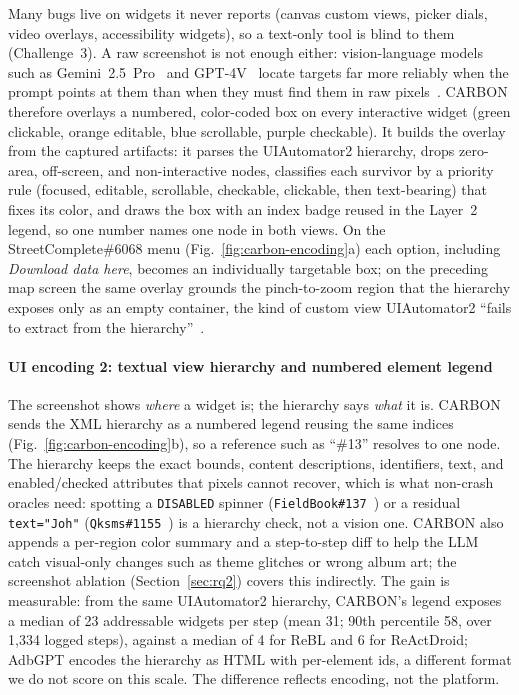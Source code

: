 \documentclass[10pt,conference,a4paper]{IEEEtran}
\begin{document}
  \iffalse
  Many bugs live on widgets it
  never reports (canvas custom views, picker dials, video overlays,
  accessibility widgets), so a text-only tool is blind to them
  (Challenge~3). A raw screenshot is not enough either: vision-language
  models such as Gemini~2.5~Pro~\cite{gemini25pro} and GPT-4V~\cite{gpt4v}
  locate targets far more reliably when the prompt points at them than
  when they must find them in raw pixels~\cite{cogagent,seeact}. CARBON
  therefore overlays a numbered, color-coded box on every interactive
  widget (green clickable, orange editable, blue scrollable, purple
  checkable). It builds the overlay from the captured artifacts: it
  parses the UIAutomator2 hierarchy, drops zero-area, off-screen, and
  non-interactive nodes, classifies each survivor by a priority rule
  (focused, editable, scrollable, checkable, clickable, then
  text-bearing) that fixes its color, and draws the box with an index
  badge reused in the Layer~2 legend, so one number names one node in
  both views. On the StreetComplete\#6068 menu
  (Fig.~\ref{fig:carbon-encoding}a) each option, including
  \emph{Download data here}, becomes an individually targetable box; on
  the preceding map screen the same overlay grounds the pinch-to-zoom
  region that the hierarchy exposes only as an empty container, the kind
  of custom view UIAutomator2 ``fails to extract from the
  hierarchy''~\cite{rebl}.


  \paragraph*{UI encoding 2: textual view hierarchy and numbered element legend}
  The screenshot shows \emph{where} a widget is; the hierarchy says
  \emph{what} it is. CARBON sends the XML hierarchy as a numbered legend
  reusing the same indices (Fig.~\ref{fig:carbon-encoding}b), so a
  reference such as ``\#13'' resolves to one node. The hierarchy keeps the
  exact bounds, content descriptions, identifiers, text, and
  enabled/checked attributes that pixels cannot recover, which is what
  non-crash oracles need: spotting a \texttt{DISABLED} spinner
  (\texttt{FieldBook\#137}~\cite{fieldbook137}) or a residual
  \texttt{text="Joh"} (\texttt{Qksms\#1155}~\cite{qksms1155}) is a
  hierarchy check, not a vision one. CARBON also appends a per-region
  color summary and a step-to-step diff to help the LLM catch
  visual-only changes such as theme glitches or wrong album art; the
  screenshot ablation (Section~\ref{sec:rq2}) covers this indirectly.
  The gain is measurable: from the same UIAutomator2 hierarchy, CARBON's
  legend exposes a median of 23 addressable widgets per step (mean 31;
  90th percentile 58, over 1{,}334 logged steps), against a median of 4
  for ReBL and 6 for ReActDroid; AdbGPT encodes the hierarchy as HTML
  with per-element ids, a different format we do not score on this
  scale. The difference reflects encoding, not the platform.
\end{document}

